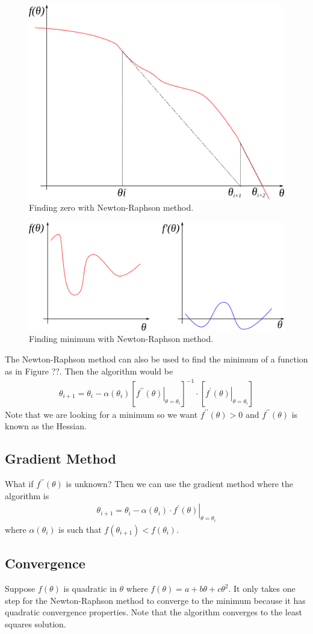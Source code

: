 \begin{figure}[ht!]
	\centering
	\includegraphics[width=.4\textwidth]{images/18nr}
	\caption{Finding zero with Newton-Raphson method.}
	\label{fig:18nr}
\end{figure}

\begin{figure}[ht!]
	\centering
	\includegraphics[width=.6\textwidth]{images/18min}
	\caption{Finding minimum with Newton-Raphson method.}
	\label{fig:18min}
\end{figure}

The Newton-Raphson method can also be used to find the minimum of a function as in Figure ??. Then the algorithm would be
\begin{align*}
\boxed{\theta_{i+1} = \theta_i - \alpha(\theta_i)\left[\left.f^{\prime\prime}(\theta)\right|_{\theta=\theta_i}\right]^{-1}\cdot\left[\left.f^\prime(\theta)\right|_{\theta=\theta_i}\right]}
\end{align*}
Note that we are looking for a minimum so we want $f^{\prime\prime}(\theta)>0$ and $f^{\prime\prime}(\theta)$ is known as the Hessian.

\subsection{Gradient Method}
What if $f^{\prime\prime}(\theta)$ is unknown? Then we can use the gradient method where the algorithm is
\begin{align*}
\boxed{\theta_{i+1} = \theta_i - \alpha(\theta_i)\cdot \left.f^\prime(\theta)\right|_{\theta=\theta_i}}
\end{align*}
where $\alpha(\theta_i)$ is such that $f(\theta_{i+1})<f(\theta_i)$.

\subsection{Convergence}
Suppose $f(\theta)$ is quadratic in $\theta$ where $f(\theta)=a+b\theta+c\theta^2$. It only takes one step for the Newton-Raphson method to converge to the minimum because it has quadratic convergence properties. Note that the algorithm converges to the least squares solution.

